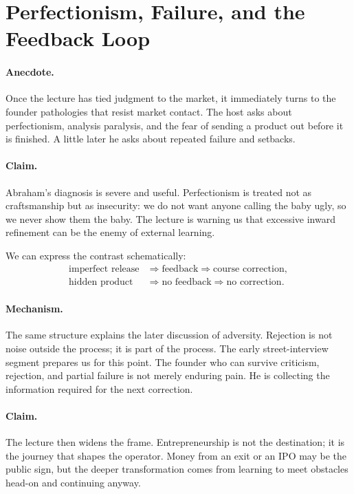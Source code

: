 \section{Perfectionism, Failure, and the Feedback Loop}

\paragraph{Anecdote.} Once the lecture has tied judgment to the market, it immediately turns to the founder pathologies that resist market contact. The host asks about perfectionism, analysis paralysis, and the fear of sending a product out before it is finished. A little later he asks about repeated failure and setbacks.

\paragraph{Claim.} Abraham's diagnosis is severe and useful. Perfectionism is treated not as craftsmanship but as insecurity: we do not want anyone calling the baby ugly, so we never show them the baby. The lecture is warning us that excessive inward refinement can be the enemy of external learning.

We can express the contrast schematically:
\begin{align}
\text{imperfect release}
&\Rightarrow \text{feedback}
\Rightarrow \text{course correction},\\
\text{hidden product}
&\Rightarrow \text{no feedback}
\Rightarrow \text{no correction}.
\end{align}

\paragraph{Mechanism.} The same structure explains the later discussion of adversity. Rejection is not noise outside the process; it is part of the process. The early street-interview segment prepares us for this point. The founder who can survive criticism, rejection, and partial failure is not merely enduring pain. He is collecting the information required for the next correction.

\paragraph{Claim.} The lecture then widens the frame. Entrepreneurship is not the destination; it is the journey that shapes the operator. Money from an exit or an IPO may be the public sign, but the deeper transformation comes from learning to meet obstacles head-on and continuing anyway.


